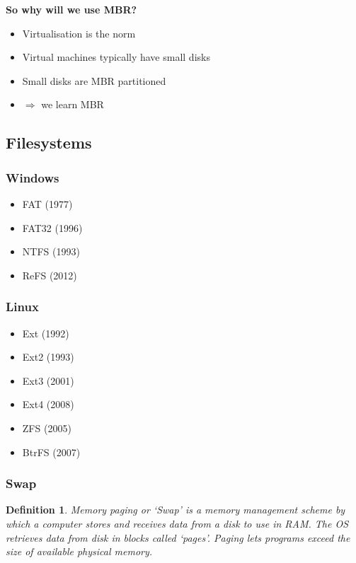 \documentclass{article}
\newtheorem{theorem}{Definition}[section]
\begin{document}
\textbf{So why will we use MBR?}

\begin{itemize}
    \item Virtualisation is the norm
    \item Virtual machines typically have small disks
    \item Small disks are MBR partitioned
    \item $\Rightarrow$ we learn MBR
\end{itemize}


\subsection{Filesystems}

\subsubsection{Windows}

\begin{itemize}
    \item FAT (1977)
    \item FAT32 (1996)
    \item NTFS (1993)
    \item ReFS (2012)
\end{itemize}

\subsubsection{Linux}

\begin{itemize}
    \item Ext (1992)
    \item Ext2 (1993)
    \item Ext3 (2001)
    \item Ext4 (2008)
    \item ZFS (2005)
    \item BtrFS (2007)
\end{itemize}

\subsubsection{Swap}

\begin{theorem}
    Memory paging or `Swap' is a memory management scheme by which a computer stores and receives data from a disk
    to use in RAM. The OS retrieves data from disk in blocks called `pages'. Paging lets programs exceed the size of available
    physical memory.
\end{theorem}
\end{document}
